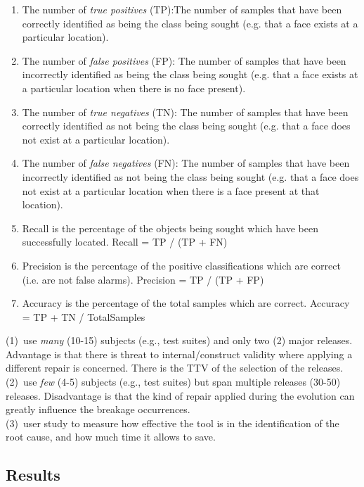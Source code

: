\begin{enumerate}
\item The number of \textit{true positives} (TP):The number of samples that have been correctly identified as being the class being sought (e.g. that a face exists at a particular location).
\item The number of \textit{false positives} (FP): The number of samples that have been incorrectly identified as being the class being sought (e.g. that a face exists at a particular location when there is no face present).
\item The number of \textit{true negatives} (TN): The number of samples that have been correctly identified as not being the class being sought (e.g. that a face does not exist at a particular location).
\item The number of \textit{false negatives} (FN): The number of samples that have been incorrectly identified as not being the class being sought (e.g. that a face does not exist at a particular location when there is a face present at that location).
\item Recall is the percentage of the objects being sought which have been successfully located. Recall = TP / (TP + FN)
\item Precision is the percentage of the positive classifications which are correct (i.e. are not false alarms). Precision = TP / (TP + FP)
\item Accuracy is the percentage of the total samples which are correct. Accuracy = TP + TN / TotalSamples
\end{enumerate}

\noindent
(1)~use \textit{many} (10-15) subjects (e.g., test suites) and only two (2) major releases. Advantage is that there is threat to internal/construct validity where applying a different repair is concerned. There is the TTV of the selection of the releases. \\

\noindent
(2)~use \textit{few} (4-5) subjects (e.g., test suites) but span multiple releases  (30-50) releases. Disadvantage is that the kind of repair applied during the evolution can greatly influence the breakage occurrences. \\

\noindent
(3)~user study to measure how effective the tool is in the identification of the root cause, and how much time it allows to save.

\subsection{Results}\label{sec:results}











